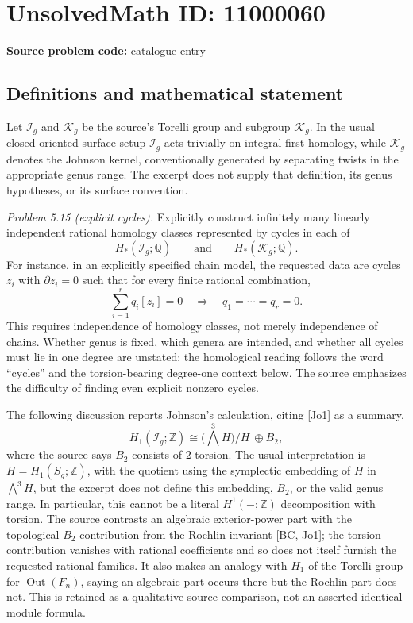 \documentclass[11pt]{article}
\newcommand{\Z}{\mathbb{Z}}
\newcommand{\Q}{\mathbb{Q}}
\begin{document}
\section*{UnsolvedMath ID: 11000060}
\textbf{Source problem code:} catalogue entry
\subsection{Definitions and mathematical statement}
Let \(\mathcal I_g\) and \(\mathcal K_g\) be the source's Torelli group and subgroup \(\mathcal K_g\). In the usual closed oriented surface setup \(\mathcal I_g\) acts trivially on integral first homology, while \(\mathcal K_g\) denotes the Johnson kernel, conventionally generated by separating twists in the appropriate genus range. The excerpt does not supply that definition, its genus hypotheses, or its surface convention.

\emph{Problem 5.15 (explicit cycles).} Explicitly construct infinitely many linearly independent rational homology classes represented by cycles in each of
\[
 H_*(\mathcal I_g;\Q)\qquad\text{and}\qquad H_*(\mathcal K_g;\Q).
\]
For instance, in an explicitly specified chain model, the requested data are cycles \(z_i\) with \(\partial z_i=0\) such that for every finite rational combination,
\[
 \sum_{i=1}^{r}q_i[z_i]=0\quad\Longrightarrow\quad q_1=\cdots=q_r=0.
\]
This requires independence of homology classes, not merely independence of chains. Whether genus is fixed, which genera are intended, and whether all cycles must lie in one degree are unstated; the homological reading follows the word ``cycles'' and the torsion-bearing degree-one context below. The source emphasizes the difficulty of finding even explicit nonzero cycles.

The following discussion reports Johnson's calculation, citing [Jo1] as a summary,
\[
 H_1(\mathcal I_g;\Z)\cong
 \bigl(\textstyle\bigwedge^3 H\bigr)/H\ \oplus B_2,
 \tag{16}
\]
where the source says \(B_2\) consists of \(2\)-torsion. The usual interpretation is \(H=H_1(S_g;\Z)\), with the quotient using the symplectic embedding of \(H\) in \(\bigwedge^3H\), but the excerpt does not define this embedding, \(B_2\), or the valid genus range. In particular, this cannot be a literal \(H^1(-;\Z)\) decomposition with torsion. The source contrasts an algebraic exterior-power part with the topological \(B_2\) contribution from the Rochlin invariant [BC, Jo1]; the torsion contribution vanishes with rational coefficients and so does not itself furnish the requested rational families. It also makes an analogy with \(H_1\) of the Torelli group for \(\operatorname{Out}(F_n)\), saying an algebraic part occurs there but the Rochlin part does not. This is retained as a qualitative source comparison, not an asserted identical module formula.
\end{document}

